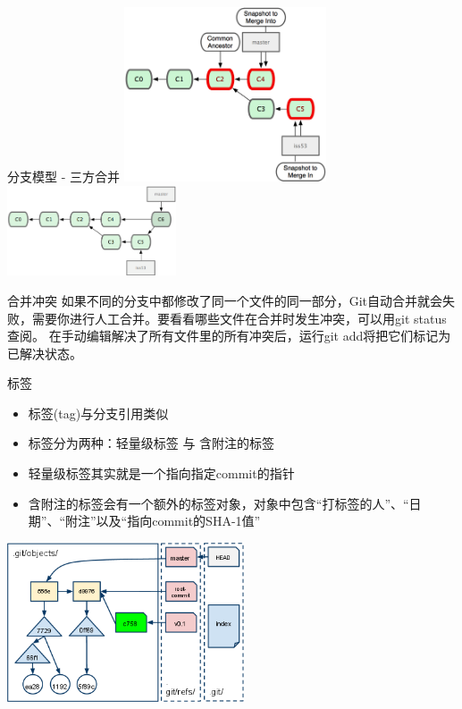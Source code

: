 \documentclass[CJK, 10pt]{beamer}
\begin{document}
\begin{CJK*}{UTF8}{gbsn}
\begin{frame}{分支模型 - 三方合并}
    \includegraphics[width=6cm]{merge-three-part.png} \hfill \includegraphics[width=5cm]{after-merge-three-part.png}
    \begin{block}{合并冲突}
        如果不同的分支中都修改了同一个文件的同一部分，Git自动合并就会失败，需要你进行人工合并。要看看哪些文件在合并时发生冲突，可以用git status查阅。
        在手动编辑解决了所有文件里的所有冲突后，运行git add将把它们标记为已解决状态。
    \end{block}
\end{frame}

\begin{frame}{标签}
    \begin{block}{}
        \begin{itemize}
            \item 标签(tag)与分支引用类似
            \item 标签分为两种：轻量级标签 与 含附注的标签
            \item 轻量级标签其实就是一个指向指定commit的指针
            \item 含附注的标签会有一个额外的标签对象，对象中包含“打标签的人”、“日期”、“附注”以及“指向commit的SHA-1值”
        \end{itemize}
    \end{block}
    \begin{center}
        \includegraphics[width=7cm]{new-tag.png}
    \end{center}
\end{frame}


\end{CJK*}
\end{document}
